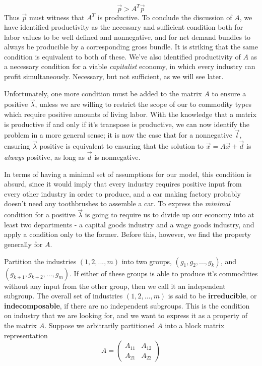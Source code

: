 \documentclass{article}
\theoremstyle{definition}
\theoremstyle{plain}
\theoremstyle{theorem}
\begin{document}
\[ \vec{p} > A^T\vec{p} \]
Thus $\vec{p}$ must witness that $A^T$ is productive. To conclude the discussion of $A$, we have identified productivity as the necessary and sufficient condition both for labor values to be well defined and nonnegative, and for net demand bundles to always be producible by a corresponding gross bundle. It is striking that the same condition is equivalent to both of these. We've also identified productivity of $A$ as a necessary condition for a viable \textit{capitalist} economy, in which every industry can profit simultaneously. Necessary, but not sufficient, as we will see later. \par 
Unfortunately, one more condition must be added to the matrix $A$ to ensure a positive $\vec{\lambda}$, unless we are willing to restrict the scope of our to commodity types which require positive amounts of living labor. With the knowledge that a matrix is productive if and only if it's transpose is productive, we can now identify the problem in a more general sense; it is now the case that for a nonnegative $\vec{l}$, ensuring $\vec{\lambda}$ positive is equivalent to ensuring that the solution to $\vec{x} = A\vec{x} + \vec{d}$ is \textit{always} positive, as long as $\vec{d}$ is nonnegative. \par
In terms of having a minimal set of assumptions for our model, this condition is absurd, since it would imply that every industry requires positive input from every other industry in order to produce, and a car making factory probably doesn't need any toothbrushes to assemble a car. To express the \emph{minimal} condition for a positive $\vec{\lambda}$ is going to require us to divide up our economy into at least two departments - a capital goods industry and a wage goods industry, and apply a condition only to the former. Before this, however, we find the property generally for $A$. \par 
Partition the industries $(1,2,...,m)$ into two groups, $(g_1,g_2,...,g_k)$, and $(g_{k+1},g_{k+2},\ldots,g_m)$. If either of these groups is able to produce it's commodities without any input from the other group, then we call it an independent subgroup. The overall set of industries $(1,2,...,m)$ is said to be \textbf{irreducible}, or \textbf{indecomposable}, if there are no independent subgroups. This is the condition on industry that we are looking for, and we want to express it as a property of the matrix $A$. Suppose we arbitrarily partitioned $A$ into a block matrix representation
\[ A = \begin{pmatrix} A_{11} & A_{12} \\ A_{21} & A_{22} \end{pmatrix} \]
\end{document}
